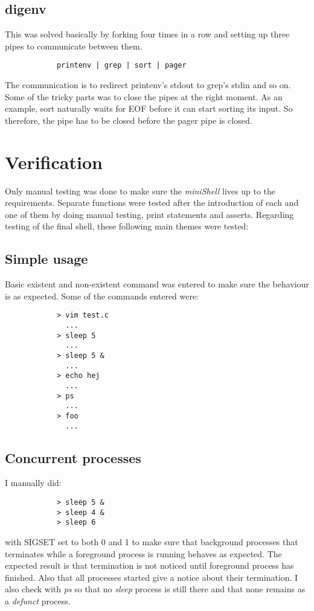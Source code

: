 \documentclass{article}
\begin{document}
   \subsection{digenv}
        This was solved basically by forking four times in a row and setting up three
        pipes to communicate between them.
        \begin{verbatim}
            printenv | grep | sort | pager
        \end{verbatim}
        The communication is to redirect printenv's stdout to grep's stdin and so on.
        Some of the tricky parts was to close the pipes at the right moment. As an
        example, sort naturally waits for EOF before it can start sorting its input.
        So therefore, the pipe has to be closed before the pager pipe is closed.
        
\section{Verification}
    Only manual testing was done to make sure the \emph{miniShell} lives up to
    the requirements. Separate functions were tested after the introduction of each
    and one of them by doing manual testing, print statements and asserts.
    Regarding testing of the final shell, these following main themes were tested:
    \subsection{Simple usage}
        Basic existent and non-existent command was entered to make sure the
        behaviour is as expected. Some of the commands entered were:
        \begin{verbatim}
            > vim test.c
              ...
            > sleep 5
              ...
            > sleep 5 &
              ...
            > echo hej
              ...
            > ps
              ...
            > foo
              ...
        \end{verbatim}

    \subsection{Concurrent processes}
        I manually did:
        \begin{verbatim}
            > sleep 5 &
            > sleep 4 &
            > sleep 6
        \end{verbatim}
        with SIGSET set to both 0 and 1 to make sure that background processes
        that terminates while a foreground process is running behaves as
        expected. The expected result is that termination is not noticed until
        foreground process has finished. Also that all processes started give a
        notice about their termination. I also check with \emph{ps} so that no
        \emph{sleep} process is still there and that none remains as a
        \emph{defunct} process.
\end{document}
